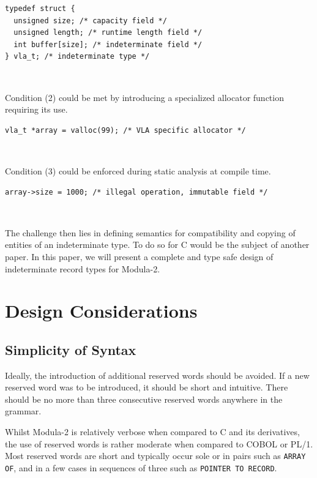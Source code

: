 \documentclass[10pt,a4paper]{article}
\begin{document}
\lstset{style=C}
\begin{lstlisting}
typedef struct {
  unsigned size; /* capacity field */
  unsigned length; /* runtime length field */
  int buffer[size]; /* indeterminate field */
} vla_t; /* indeterminate type */
\end{lstlisting}~

\noindent Condition (2) could be met by introducing a specialized allocator 
function requiring its use.

\lstset{style=C}
\begin{lstlisting}
vla_t *array = valloc(99); /* VLA specific allocator */
\end{lstlisting}~

\noindent Condition (3) could be enforced during static analysis at compile 
time.

\lstset{style=C}
\begin{lstlisting}
array->size = 1000; /* illegal operation, immutable field */
\end{lstlisting}~


\noindent The challenge then lies in defining semantics for compatibility and
copying of entities of an \gls{indeterminate type}. To do so for C would be the
subject  of another paper. In this paper, we will present a complete and type 
safe design of indeterminate record types for Modula-2.

\newpage

\section{Design Considerations}

\subsection{Simplicity of Syntax}

Ideally, the introduction of additional reserved words should be avoided.
If a new reserved word was to be introduced, it should be short and intuitive.
There should be no more than three consecutive reserved words anywhere in the
grammar.\\

\par\noindent Whilst Modula-2 is relatively verbose when compared to C and its
derivatives, the use of reserved words is rather moderate when compared to
COBOL or PL/1. Most reserved words are short and typically occur sole or in
pairs such as \verb|ARRAY OF|, and in a few cases in sequences of three such as
\verb|POINTER TO RECORD|.  
\end{document}
